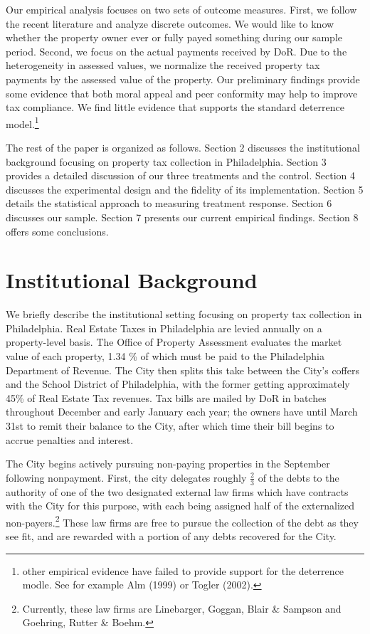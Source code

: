 \documentclass[12pt,titlepage]{article}
\begin{document}
Our empirical analysis focuses on two sets of outcome measures. First,
we follow the recent literature and analyze discrete outcomes. We
would like to know whether the property owner ever or fully payed something
during our sample period.  Second, we focus on the actual payments received
by DoR.  Due to the heterogeneity in assessed values, we normalize the
received property tax payments by the assessed value of the property.
Our preliminary findings provide some evidence that both moral appeal
and peer conformity may help to improve tax compliance. We find
little evidence that supports the standard deterrence model.\footnote{other
empirical evidence have failed to provide support for the deterrence
modle. See for example Alm (1999) or Togler (2002).}

The rest of the paper is organized as follows. Section 2 discusses the
institutional background focusing on property tax collection in
Philadelphia.  Section 3 provides a detailed discussion of our
three treatments and the control. Section 4 discusses the experimental design and the
fidelity of its implementation. Section 5 details the statistical
approach to measuring treatment response. Section 6 discusses our sample. Section 7 
presents our current empirical findings.  Section 8 offers some conclusions.


\section{Institutional Background}

We briefly describe the institutional setting focusing
on property tax collection in Philadelphia.  Real Estate Taxes in
Philadelphia are levied annually on a property-level basis.  The
Office of Property Assessment evaluates the market value of each
property, 1.34 \% of which must be paid to the Philadelphia Department
of Revenue. The City then splits this take between the City's coffers
and the School District of Philadelphia, with the former getting
approximately 45\% of Real Estate Tax revenues. Tax bills are mailed by DoR in batches throughout December and early
January each year; the owners have until March 31st to remit their
balance to the City, after which
time their bill begins to accrue penalties and interest.

The City begins actively pursuing non-paying properties in the
September following nonpayment.  First, the city delegates roughly
$\frac{2}{3}$ of the debts to the authority of one of the two
designated external law firms which have contracts with the City for
this purpose, with each being assigned half of the externalized
non-payers.\footnote{Currently, these law firms are Linebarger, Goggan,
  Blair \& Sampson and Goehring, Rutter \& Boehm.} These law firms
are free to pursue the collection of the debt as they see fit, and are
rewarded with a portion of any debts recovered for the City.
\end{document}
